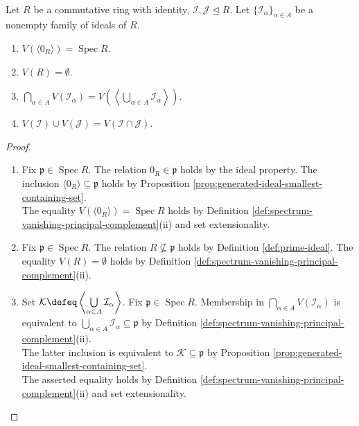 \begin{proposition} \label{prop:vanishing-set-calculus} \\
Let $R$ be a commutative ring with identity, $\mathcal{I},\mathcal{J}\trianglelefteq R$. Let $\{\mathcal{I}_{\alpha}\}_{\alpha\in A}$ be a nonempty family of ideals of $R$.
\begin{enumerate}[label=(\roman*)]
\setlength{\itemsep}{0pt}
\item $V(\langle0_R\rangle)=\operatorname{Spec}R$.
\item $V(R)=\emptyset$.
\item $\bigcap\limits_{\alpha\in A}V(\mathcal{I}_{\alpha})=V\left(\left\langle\bigcup\limits_{\alpha\in A}\mathcal{I}_{\alpha}\right\rangle\right)$.
\item $V(\mathcal{I})\cup V(\mathcal{J})=V(\mathcal{I}\cap\mathcal{J})$.
\end{enumerate}
\begin{proof}
\begin{enumerate}[label=(\roman*)]
\setlength{\itemsep}{0pt}
\item Fix $\mathfrak{p}\in\operatorname{Spec}R$. The relation $0_R\in\mathfrak{p}$ holds by the ideal property. The inclusion $\langle0_R\rangle\subseteq\mathfrak{p}$ holds by Proposition \ref{prop:generated-ideal-smallest-containing-set}.\\
The equality $V(\langle0_R\rangle)=\operatorname{Spec}R$ holds by Definition \ref{def:spectrum-vanishing-principal-complement}(ii) and set extensionality.
\item Fix $\mathfrak{p}\in\operatorname{Spec}R$. The relation $R\nsubseteq\mathfrak{p}$ holds by Definition \ref{def:prime-ideal}. The equality $V(R)=\emptyset$ holds by Definition \ref{def:spectrum-vanishing-principal-complement}(ii).
\item Set $\mathcal{K}\defeq\left\langle\bigcup\limits_{\alpha\in A}\mathcal{I}_{\alpha}\right\rangle$. Fix $\mathfrak{p}\in\operatorname{Spec}R$. Membership in $\bigcap\limits_{\alpha\in A}V(\mathcal{I}_{\alpha})$ is equivalent to $\bigcup\limits_{\alpha\in A}\mathcal{I}_{\alpha}\subseteq\mathfrak{p}$ by Definition \ref{def:spectrum-vanishing-principal-complement}(ii).\\
The latter inclusion is equivalent to $\mathcal{K}\subseteq\mathfrak{p}$ by Proposition \ref{prop:generated-ideal-smallest-containing-set}.\\
The asserted equality holds by Definition \ref{def:spectrum-vanishing-principal-complement}(ii) and set extensionality.

\end{enumerate}
\end{proof}
\end{proposition}
